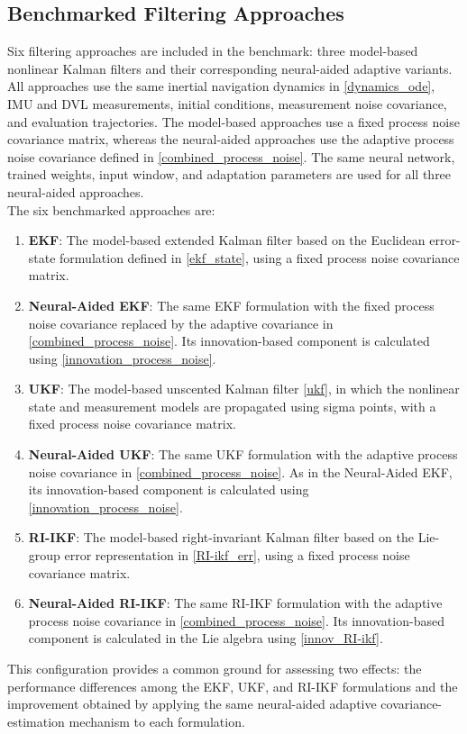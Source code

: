 \documentclass[conference]{IEEEtran}
\begin{document}
\subsection{Benchmarked Filtering Approaches}
\noindent Six filtering approaches are included in the benchmark: three model-based nonlinear Kalman filters and their corresponding neural-aided adaptive variants. All approaches use the same inertial navigation dynamics in \eqref{dynamics_ode}, IMU and DVL measurements, initial conditions, measurement noise covariance, and evaluation trajectories. The model-based approaches use a fixed process noise covariance matrix, whereas the neural-aided approaches use the adaptive process noise covariance defined in \eqref{combined_process_noise}. The same neural network, trained weights, input window, and adaptation parameters are used for all three neural-aided approaches. \\
\noindent The six benchmarked approaches are:
\begin{enumerate}
\item \textbf{EKF}: The model-based extended Kalman filter based on the Euclidean error-state formulation defined in \eqref{ekf_state}, using a fixed process noise covariance matrix.
\item \textbf{Neural-Aided EKF}: The same EKF formulation with the fixed process noise covariance replaced by the adaptive covariance in \eqref{combined_process_noise}. Its innovation-based component is calculated using \eqref{innovation_process_noise}.
\item \textbf{UKF}: The model-based unscented Kalman filter \ref{ukf}, in which the nonlinear state and measurement models are propagated using sigma points, with a fixed process noise covariance matrix.
\item \textbf{Neural-Aided UKF}: The same UKF formulation with the adaptive process noise covariance in \eqref{combined_process_noise}. As in the Neural-Aided EKF, its innovation-based component is calculated using \eqref{innovation_process_noise}.
\item \textbf{RI-IKF}: The model-based right-invariant Kalman filter based on the Lie-group error representation in \eqref{RI-ikf_err}, using a fixed process noise covariance matrix.
\item \textbf{Neural-Aided RI-IKF}: The same RI-IKF formulation with the adaptive process noise covariance in \eqref{combined_process_noise}. Its innovation-based component is calculated in the Lie algebra using \eqref{innov_RI-ikf}.
\end{enumerate}
\noindent This configuration provides a common ground for assessing two effects: the performance differences among the EKF, UKF, and RI-IKF formulations and the improvement obtained by applying the same neural-aided adaptive covariance-estimation mechanism to each formulation. 
\end{document}
